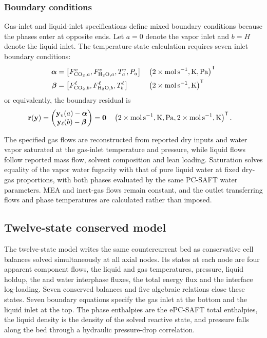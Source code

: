 \subsubsection{Boundary conditions}
Gas-inlet and liquid-inlet specifications define mixed boundary conditions because the phases enter at opposite ends.
Let $a=0$ denote the vapor inlet and $b=H$ denote the liquid inlet.
The temperature-state calculation requires seven inlet boundary conditions:
\begin{align}
\boldsymbol{\alpha} &= \left[\molarflow^{\vap}_{ \COtwo, a}, \molarflow^{\vap}_{ \HtwoO, a}, \temperature^{\vap}_{ a}, \pressure_{a}\right]
&& \left(
2\times\unit{mol\,s^{-1}},
\unit{K},
\unit{Pa}
\right)^{\mathsf{T}}\label{eq:boundary-conditions}\\
\boldsymbol{\beta} &= \left[\molarflow^{\liq}_{ \COtwo, b}, \molarflow^{\liq}_{ \HtwoO, b}, \temperature^{\liq}_{ b}\right]
&& \left(
2\times\unit{mol\,s^{-1}},
\unit{K}
\right)^{\mathsf{T}}
\end{align}
or equivalently, the boundary residual is
\begin{align}
\mathbf{r}(\mathbf{y}) &=
\begin{pmatrix}
\mathbf{y}_{\vap}(a)-\boldsymbol{\alpha}\\
\mathbf{y}_{\liq}(b)-\boldsymbol{\beta}
\end{pmatrix}
=
\mathbf{0}
&& \left(
2\times\unit{mol\,s^{-1}},
\unit{K},
\unit{Pa},
2\times\unit{mol\,s^{-1}},
\unit{K}
\right)^{\mathsf{T}}.\label{eq:boundary-residual}
\end{align}

The specified gas flows are reconstructed from reported dry inputs and water vapor saturated at the gas-inlet temperature and pressure, while liquid flows follow reported mass flow, solvent composition and lean loading.
Saturation solves equality of the vapor water fugacity with that of pure liquid water at fixed dry-gas proportions, with both phases evaluated by the same PC-SAFT water parameters.
MEA and inert-gas flows remain constant, and the outlet transferring flows and phase temperatures are calculated rather than imposed.

\subsection{Twelve-state conserved model}\label{subsec:twelve-state}
The twelve-state model writes the same countercurrent bed as conservative cell balances solved simultaneously at all axial nodes.
Its states at each node are four apparent component flows, the liquid and gas temperatures, pressure, liquid holdup, the \COtwo{} and water interphase fluxes, the total energy flux and the interface log-loading.
Seven conserved balances and five algebraic relations close these states.
Seven boundary equations specify the gas inlet at the bottom and the liquid inlet at the top.
The phase enthalpies are the ePC-SAFT total enthalpies, the liquid density is the density of the solved reactive state, and pressure falls along the bed through a hydraulic pressure-drop correlation.

